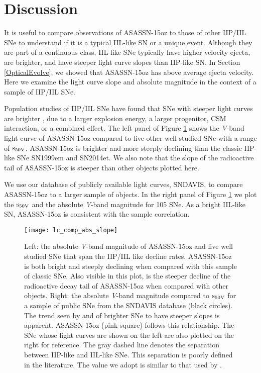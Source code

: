 \documentclass[a4paper,fleqn,usenatbib]{mnras}
\begin{document}
\section{Discussion} \label{SecComp}
It is useful to compare observations of ASASSN-15oz to those of other IIP/IIL SNe to understand if it is a typical IIL-like SN or a unique event.
Although they are part of a continuous class, IIL-like SNe typically have higher velocity ejecta, are brighter, and have steeper light curve slopes than IIP-like SN.
In Section \ref{OpticalEvolve}, we showed that ASASSN-15oz has above average ejecta velocity.
Here we examine the light curve slope and absolute magnitude in the context of a sample of IIP/IIL SNe.

Population studies of IIP/IIL SNe have found that SNe with steeper light curves are brighter \citep{2011li,2014anderson,2015sanders,2016valenti}, due to a larger explosion energy, a larger progenitor, CSM interaction, or a combined effect. 
The left panel of Figure \ref{fig:SlopeMag} shows the {\it V}-band light curve of ASASSN-15oz compared to five other well studied SNe with a range of $\rm{s_{50V}}$.
ASASSN-15oz is brighter and more steeply declining than the classic IIP-like SNe SN1999em and SN2014et.
We also note that the slope of the radioactive tail of ASASSN-15oz is steeper than other objects plotted here.

We use our database of publicly available light curves, SNDAVIS, to compare ASASSN-15oz to a larger sample of objects.
In the right panel of Figure \ref{fig:SlopeMag} we plot the $\rm{s_{50V}}$ and the absolute {\it V}-band magnitude for 105 SNe. 
As a bright IIL-like SN, ASASSN-15oz is consistent with the sample correlation.
\begin{figure*}
\begin{center}
\texttt{[image: lc\_comp\_abs\_slope]} %
\caption{Left: the absolute {\it V}-band magnitude of ASASSN-15oz and five well studied SNe that span the IIP/IIL like decline rates. 
ASASSN-15oz is both bright and steeply declining when compared with this sample of classic SNe.
Also visible in this plot, is the steeper decline of the radioactive decay tail of ASASSN-15oz when compared with other objects.
Right: the absolute {\it V}-band magnitude compared to $\rm{s_{50V}}$ for a sample of public SNe from the SNDAVIS database (black circles). 
The trend seen by \citet{2014anderson} and \citet{2016valenti} of brighter SNe to have steeper slopes is apparent. 
ASASSN-15oz (pink square) follows this relationship. 
The SNe whose light curves are shown on the left are also plotted on the right for reference.
The gray dashed line denotes the separation between IIP-like and IIL-like SNe.
This separation is poorly defined in the literature.
The value we adopt is similar to that used by \citet{2014faran, 2011li}.
}
\label{fig:SlopeMag}
\end{center}
\end{figure*}
\end{document}
